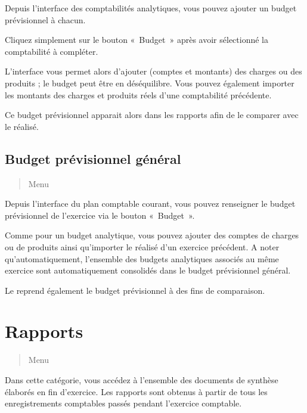 \documentclass[a4paper,10pt,oneside,french]{sphinxmanual}
\begin{document}
Depuis l’interface des comptabilités analytiques, vous pouvez ajouter un budget prévisionnel à chacun.

Cliquez simplement sur le bouton « Budget » après avoir sélectionné la comptabilité à compléter.

L’interface vous permet alors d’ajouter (comptes et montants) des charges ou des produits ; le budget peut être en déséquilibre.
Vous pouvez également importer les montants des charges et produits réels d’une comptabilité précédente.

Ce budget prévisionnel apparait alors dans les rapports afin de le comparer avec le réalisé.


\subsection{Budget prévisionnel général}
\label{\detokenize{accounting/budget:budget-previsionnel-general}}\begin{quote}

Menu 
\end{quote}

Depuis l’interface du plan comptable courant, vous pouvez renseigner le budget prévisionnel de l’exercice via le bouton « Budget ».

Comme pour un budget analytique, vous pouvez ajouter des comptes de charges ou de produits ainsi qu’importer le réalisé d’un exercice précédent.
A noter qu’automatiquement, l’ensemble des budgets analytiques associés au même exercice sont automatiquement consolidés dans le budget prévisionnel général.

Le  reprend également le budget prévisionnel à des fins de comparaison.


\section{Rapports}
\label{\detokenize{accounting/reporting:rapports}}\label{\detokenize{accounting/reporting::doc}}\begin{quote}

Menu 
\end{quote}

Dans cette catégorie, vous accédez à l’ensemble des documents de synthèse élaborés en fin d’exercice. Les rapports sont obtenus à partir de tous les enregistrements comptables passés pendant l’exercice comptable.
\end{document}

